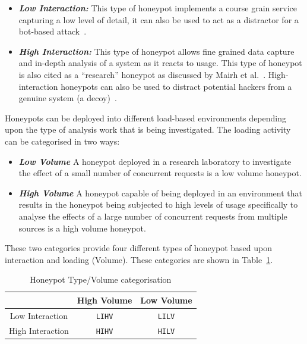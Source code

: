 \begin{itemize}
\item \noindent \emph{\textbf{Low Interaction:}} This type of honeypot implements a course grain service capturing a low level of detail, it can also be used to act as a distractor for a bot-based attack~\cite{SZB:16}.
\newline
\item \noindent \emph{\textbf{High Interaction:}} This type of honeypot allows fine grained data capture and in-depth analysis of a system as it reacts to usage. This type of honeypot is also cited as a ``research'' honeypot as discussed by Mairh et al.~\cite{MBVJ:11}. High-interaction honeypots can also be used to distract potential hackers from a genuine system (a decoy)~\cite{M:06,SNKA:12}. 
\end{itemize}

Honeypots can be deployed into different load-based environments depending upon the type of analysis work that is being investigated. The loading activity can be categorised in two ways:
 
\begin{itemize}
\item \noindent \emph{\textbf{Low Volume}} A honeypot deployed in a research laboratory to investigate the effect of a small number of concurrent requests is a low volume honeypot.
\item \noindent \emph{\textbf{High Volume}} A honeypot capable of being deployed in an environment that results in the honeypot being subjected to high levels of usage specifically to analyse the effects of a large number of concurrent requests from multiple sources is a high volume honeypot.
\end{itemize}
 
These two categories provide four different types of honeypot based upon interaction and loading (Volume). These categories are shown in Table~\ref{table:HoneypotTypes}.

\begin{table}[h]
\begin{center}
\begin{tabular}{ | c | c| c | } 
\hline
 & High Volume & Low Volume\\ 
\hline
Low Interaction & \texttt{LIHV} & \texttt{LILV} \\ 
\hline
High Interaction & \texttt{HIHV} & \texttt{HILV} \\ 
\hline
\end{tabular}
\end{center}
\caption{Honeypot Type/Volume categorisation}
\label{table:HoneypotTypes}
\end{table}

